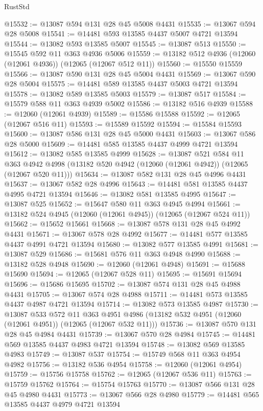 \begin{lexlean}{RustStd}
\begin{coremodule}
@15532 := @13087 @594 @131 @28 @45 @5008 @4431
@15535 := @13067 @594 @28 @5008
@15541 := @14481 @593 @13585 @4437 @5007 @4721 @13594
@15544 := @13082 @593 @13585 @5007
@15545 := @13087 @513
@15550 := @15545 @592 @11 @363 @4936 @5006
@15559 := @13182 @512 @4936 (@12060 (@12061 @4936)) (@12065 (@12067 @512 @11))
@15560 := @15550 @15559
@15566 := @13087 @590 @131 @28 @45 @5004 @4431
@15569 := @13067 @590 @28 @5004
@15575 := @14481 @589 @13585 @4437 @5003 @4721 @13594
@15578 := @13082 @589 @13585 @5003
@15579 := @13087 @517
@15584 := @15579 @588 @11 @363 @4939 @5002
@15586 := @13182 @516 @4939
@15588 := @12060 (@12061 @4939)
@15589 := @15586 @15588
@15592 := @12065 (@12067 @516 @11)
@15593 := @15589 @15592
@15594 := @15584 @15593
@15600 := @13087 @586 @131 @28 @45 @5000 @4431
@15603 := @13067 @586 @28 @5000
@15609 := @14481 @585 @13585 @4437 @4999 @4721 @13594
@15612 := @13082 @585 @13585 @4999
@15628 := @13087
    @521
    @584
    @11
    @363
    @4942
    @4998
    (@13182 @520 @4942 (@12060 (@12061 @4942)) (@12065 (@12067 @520 @11)))
@15634 := @13087 @582 @131 @28 @45 @4996 @4431
@15637 := @13067 @582 @28 @4996
@15643 := @14481 @581 @13585 @4437 @4995 @4721 @13594
@15646 := @13082 @581 @13585 @4995
@15647 := @13087 @525
@15652 := @15647 @580 @11 @363 @4945 @4994
@15661 := @13182 @524 @4945 (@12060 (@12061 @4945)) (@12065 (@12067 @524 @11))
@15662 := @15652 @15661
@15668 := @13087 @578 @131 @28 @45 @4992 @4431
@15671 := @13067 @578 @28 @4992
@15677 := @14481 @577 @13585 @4437 @4991 @4721 @13594
@15680 := @13082 @577 @13585 @4991
@15681 := @13087 @529
@15686 := @15681 @576 @11 @363 @4948 @4990
@15688 := @13182 @528 @4948
@15690 := @12060 (@12061 @4948)
@15691 := @15688 @15690
@15694 := @12065 (@12067 @528 @11)
@15695 := @15691 @15694
@15696 := @15686 @15695
@15702 := @13087 @574 @131 @28 @45 @4988 @4431
@15705 := @13067 @574 @28 @4988
@15711 := @14481 @573 @13585 @4437 @4987 @4721 @13594
@15714 := @13082 @573 @13585 @4987
@15730 := @13087
    @533
    @572
    @11
    @363
    @4951
    @4986
    (@13182 @532 @4951 (@12060 (@12061 @4951)) (@12065 (@12067 @532 @11)))
@15736 := @13087 @570 @131 @28 @45 @4984 @4431
@15739 := @13067 @570 @28 @4984
@15745 := @14481 @569 @13585 @4437 @4983 @4721 @13594
@15748 := @13082 @569 @13585 @4983
@15749 := @13087 @537
@15754 := @15749 @568 @11 @363 @4954 @4982
@15756 := @13182 @536 @4954
@15758 := @12060 (@12061 @4954)
@15759 := @15756 @15758
@15762 := @12065 (@12067 @536 @11)
@15763 := @15759 @15762
@15764 := @15754 @15763
@15770 := @13087 @566 @131 @28 @45 @4980 @4431
@15773 := @13067 @566 @28 @4980
@15779 := @14481 @565 @13585 @4437 @4979 @4721 @13594

\end{coremodule}
\end{lexlean}

